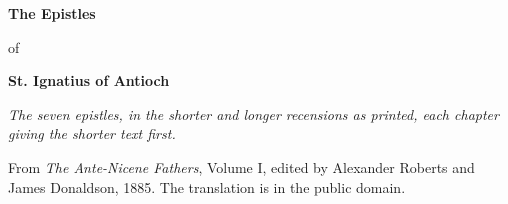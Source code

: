 \documentclass[11pt,letterpaper]{article}
\begin{document}
\color{ink}

\begin{titlepage}
\centering
\vspace*{4em}
{\LARGE\bfseries\color{heading} The Epistles\par}
\vspace{1em}
{\large of\par}
\vspace{1em}
{\LARGE\bfseries\color{heading} St. Ignatius of Antioch\par}
\vspace{2em}
{\itshape\color{subhead} The seven epistles, in the shorter and longer
recensions as printed, each chapter giving the shorter text first.\par}
\vfill
{\small From \emph{The Ante-Nicene Fathers}, Volume I, edited by
Alexander Roberts and James Donaldson, 1885. The translation is in the
public domain.\par}
\vspace{2em}
\end{titlepage}

\tableofcontents
\clearpage


\end{document}
